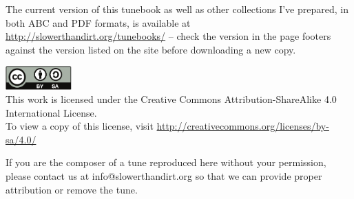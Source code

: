 \begin{titlepage}
\begin{center}
\begin{minipage}{6in}
The current version of this tunebook as well as other collections I've
prepared, in both ABC and PDF formats, is available at 
\url{http://slowerthandirt.org/tunebooks/} -- check the version in the page
footers against the version listed on the site before downloading a new
copy.



\end{minipage}

\vfill


\includegraphics[width=1in]{../includes/cc-by-sa}\\
This work is licensed under the Creative Commons
Attribution-ShareAlike 4.0 International License.\\
To view a copy of this license, visit 
\url{http://creativecommons.org/licenses/by-sa/4.0/}

\end{center}
\end{titlepage}

\clearpage



\vfill

\noindent
If you are the composer of a tune reproduced here without your permission,
please contact us at info@slowerthandirt.org so that we can provide proper
attribution or remove the tune.

\cleardoublepage
